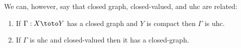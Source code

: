 \documentclass{article}
\begin{document}
We can, however, say that closed graph, closed-valued, and uhc are related:
\begin{claim}
  \begin{enumerate}
    \item If $\Gamma: X \toto Y$ has a closed graph and $Y$ is compact then $\Gamma$ is uhc.

    \item If $\Gamma$ is uhc and closed-valued then it has a closed-graph.
  \end{enumerate}
\end{claim}

\clearpage
\printindex

\end{document}
